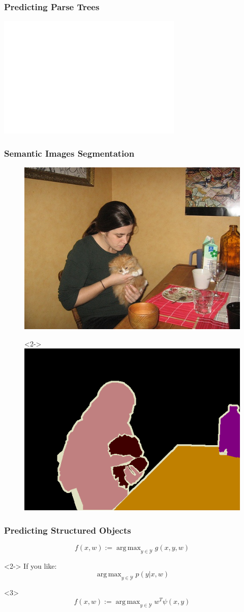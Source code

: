\documentclass[final,ignorenonframetext,compress]{beamer}
\DeclareMathOperator*{\argmax}{arg\,max}
\begin{document}
\begin{frame}
    \frametitle{Predicting Parse Trees}
    \begin{center}
        \includegraphics[width=.8\linewidth]{images/parse_tree}
    \end{center}
\end{frame}

\begin{frame}
    \frametitle{Semantic Images Segmentation}
    \begin{figure}
        \includegraphics[width=.45 \textwidth]{images/pascal}
        \begin{visibleenv}<2->
            \includegraphics[width=.45 \textwidth]{images/pascal_gt}
        \end{visibleenv}
    \end{figure}
\end{frame}

\begin{frame}
    \frametitle{Predicting Structured Objects}
    \[f(x, w) := \argmax_{y \in \mathcal{Y}}  g(x, y, w) \]
    \begin{visibleenv}<2->
    If you like:
    \[\argmax_{y \in \mathcal{Y}}  p(y|x, w) \]
    \end{visibleenv}
    
    \begin{visibleenv}<3>
    \[f(x, w) := \argmax_{y \in \mathcal{Y}}  w^T \psi(x, y) \]
    \end{visibleenv}
\end{frame}
\end{document}
